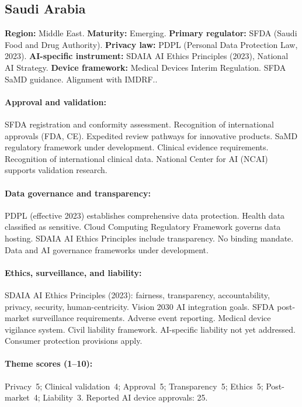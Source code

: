 {\subsection{Saudi Arabia}
\textbf{Region:} Middle East.
\textbf{Maturity:} Emerging.
\textbf{Primary regulator:} SFDA (Saudi Food and Drug Authority).
\textbf{Privacy law:} PDPL (Personal Data Protection Law, 2023).
\textbf{AI-specific instrument:} SDAIA AI Ethics Principles (2023), National AI Strategy.
\textbf{Device framework:} Medical Devices Interim Regulation. SFDA SaMD guidance. Alignment with IMDRF..

\paragraph{Approval and validation:}
SFDA registration and conformity assessment. Recognition of international approvals (FDA, CE). Expedited review pathways for innovative products. SaMD regulatory framework under development.
Clinical evidence requirements. Recognition of international clinical data. National Center for AI (NCAI) supports validation research.

\paragraph{Data governance and transparency:}
PDPL (effective 2023) establishes comprehensive data protection. Health data classified as sensitive. Cloud Computing Regulatory Framework governs data hosting.
SDAIA AI Ethics Principles include transparency. No binding mandate. Data and AI governance frameworks under development.

\paragraph{Ethics, surveillance, and liability:}
SDAIA AI Ethics Principles (2023): fairness, transparency, accountability, privacy, security, human-centricity. Vision 2030 AI integration goals.
SFDA post-market surveillance requirements. Adverse event reporting. Medical device vigilance system.
Civil liability framework. AI-specific liability not yet addressed. Consumer protection provisions apply.

\paragraph{Theme scores (1--10):}
Privacy~5;
Clinical validation~4;
Approval~5;
Transparency~5;
Ethics~5;
Post-market~4;
Liability~3.
Reported AI device approvals: 25.

}
